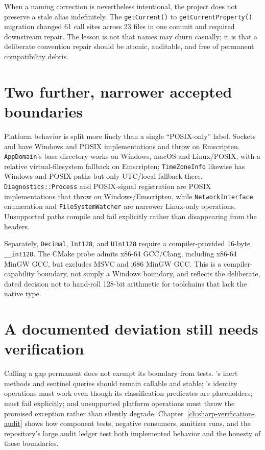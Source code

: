 When a naming correction is nevertheless intentional, the project does not preserve a stale
alias indefinitely. The \texttt{getCurrent()} to \texttt{getCurrentProperty()} migration
changed 61 call sites across 23 files in one commit and required downstream repair. The lesson
is not that names may churn casually; it is that a deliberate convention repair should be
atomic, auditable, and free of permanent compatibility debris.

\section{Two further, narrower accepted boundaries}

Platform behavior is split more finely than a single ``POSIX-only'' label. Sockets and
 have Windows and POSIX implementations and throw on Emscripten.
\texttt{AppDomain}'s base directory works on Windows, macOS and Linux/POSIX, with a relative
virtual-filesystem fallback on Emscripten; \texttt{TimeZoneInfo} likewise has Windows and POSIX
paths but only UTC/local fallback there. \texttt{Diagnostics::Process} and POSIX-signal
registration are POSIX implementations that throw on Windows/Emscripten, while
\texttt{NetworkInterface} enumeration and \texttt{FileSystemWatcher} are narrower Linux-only
operations. Unsupported paths compile and fail explicitly rather than disappearing from the
headers.

Separately, \texttt{Decimal}, \texttt{Int128},
and \texttt{UInt128} require a compiler-provided 16-byte \texttt{\_\_int128}. The CMake probe
admits x86-64 GCC/Clang, including x86-64 MinGW GCC, but excludes MSVC and i686 MinGW GCC. This
is a compiler-capability boundary, not simply a Windows boundary, and reflects the deliberate,
dated decision not to hand-roll 128-bit arithmetic for toolchains that lack the native type.

\section{A documented deviation still needs verification}

Calling a gap permanent does not exempt its boundary from tests. 's inert methods
and sentinel queries should remain callable and stable; 's identity operations
must work even though its classification
predicates are placeholders;  must fail explicitly; and
unsupported platform operations must throw the promised exception rather than silently
degrade. Chapter~\ref{ch:sharp-verification-audit} shows how component tests, negative
consumers, sanitizer runs, and the repository's large audit ledger test both implemented
behavior and the honesty of these boundaries.
